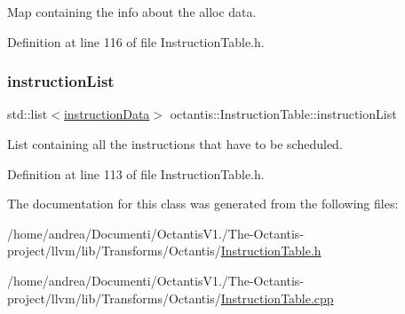 Map containing the info about the alloc data. 



Definition at line 116 of file Instruction\+Table.\+h.

\mbox{\label{classoctantis_1_1InstructionTable_a3b03228ed9a4db4430563ff61fcc6c6e}} 
\subsubsection{\texorpdfstring{instruction\+List}{instructionList}}
{\footnotesize\ttfamily std\+::list$<$\hyperlink{structoctantis_1_1InstructionTable_1_1instructionData}{instruction\+Data}$>$ octantis\+::\+Instruction\+Table\+::instruction\+List}



List containing all the instructions that have to be scheduled. 



Definition at line 113 of file Instruction\+Table.\+h.



The documentation for this class was generated from the following files\+:\begin{DoxyCompactItemize}
\item 
/home/andrea/\+Documenti/\+Octantis\+V1./\+The-\/\+Octantis-\/project/llvm/lib/\+Transforms/\+Octantis/\hyperlink{InstructionTable_8h}{Instruction\+Table.\+h}\item 
/home/andrea/\+Documenti/\+Octantis\+V1./\+The-\/\+Octantis-\/project/llvm/lib/\+Transforms/\+Octantis/\hyperlink{InstructionTable_8cpp}{Instruction\+Table.\+cpp}\end{DoxyCompactItemize}
